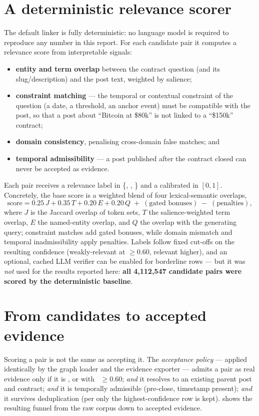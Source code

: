 \section{A deterministic relevance scorer}
The default linker is fully deterministic: no language model is required to reproduce
any number in this report. For each candidate  pair it computes
a relevance score from interpretable signals:
\begin{itemize}
  \item \textbf{entity and term overlap} between the contract question (and its
  slug/description) and the post text, weighted by salience;
  \item \textbf{constraint matching} --- the temporal or contextual constraint of the
  question (a date, a threshold, an anchor event) must be compatible with the post,
  so that a post about ``Bitcoin at \$80k'' is not linked to a ``\$150k'' contract;
  \item \textbf{domain consistency}, penalising cross-domain false matches; and
  \item \textbf{temporal admissibility} --- a post published after the contract closed
  can never be accepted as evidence.
\end{itemize}
Each pair receives a relevance label in \{, ,
\} and a calibrated  in $[0,1]$. Concretely, the base
score is a weighted blend of four lexical-semantic overlaps,
\begin{equation}
\text{score} = 0.25\,J + 0.35\,T + 0.20\,E + 0.20\,Q \;+\; (\text{gated bonuses})
\;-\; (\text{penalties}),
\label{eq:relevance}
\end{equation}
where $J$ is the Jaccard overlap of token sets, $T$ the salience-weighted term overlap,
$E$ the named-entity overlap, and $Q$ the overlap with the generating query; constraint
matches add gated bonuses, while domain mismatch and temporal inadmissibility apply
penalties. Labels follow fixed cut-offs on the resulting confidence (weakly-relevant at
$\geq\!0.60$, relevant higher), and an optional, cached LLM verifier can be enabled for
borderline rows --- but it was \emph{not} used for the results reported here:
\textbf{all 4{,}112{,}547 candidate pairs were scored by the deterministic baseline}.

\section{From candidates to accepted evidence}
Scoring a pair is not the same as accepting it. The \emph{acceptance policy} ---
applied identically by the graph loader and the evidence exporter --- admits a pair as
real evidence only if it is , or  with
~$\geq 0.60$; \emph{and} it resolves to an existing parent post and
contract; \emph{and} it is temporally admissible (pre-close, timestamp present);
\emph{and} it survives deduplication (per  only the
highest-confidence row is kept).  shows the resulting funnel from the
raw corpus down to accepted evidence.

